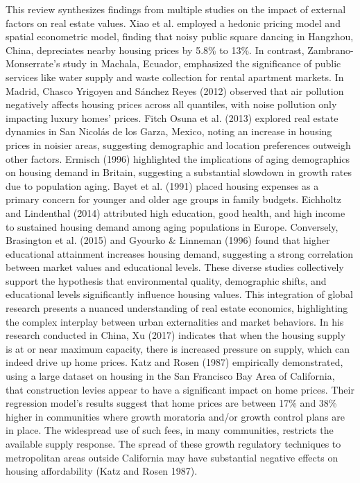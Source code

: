 \documentclass{aip-cp}
\begin{document}
This review synthesizes findings from multiple studies on the impact of external factors on real estate values. Xiao et al.\cite{XIAO2020} employed a hedonic pricing model and spatial econometric model, finding that noisy public square dancing in Hangzhou, China, depreciates nearby housing prices by 5.8\% to 13\%. In contrast, Zambrano-Monserrate's\cite{zambrano2016formacion} study in Machala, Ecuador, emphasized the significance of public services like water supply and waste collection for rental apartment markets. In Madrid, Chasco Yrigoyen and Sánchez Reyes (2012) observed that air pollution negatively affects housing prices across all quantiles, with noise pollution only impacting luxury homes' prices. Fitch Osuna et al. (2013) explored real estate dynamics in San Nicolás de los Garza, Mexico, noting an increase in housing prices in noisier areas, suggesting demographic and location preferences outweigh other factors.
Ermisch (1996) highlighted the implications of aging demographics on housing demand in Britain, suggesting a substantial slowdown in growth rates due to population aging. Bayet et al. (1991) placed housing expenses as a primary concern for younger and older age groups in family budgets. Eichholtz and Lindenthal (2014) attributed high education, good health, and high income to sustained housing demand among aging populations in Europe. Conversely, Brasington et al. (2015) and Gyourko \& Linneman (1996) found that higher educational attainment increases housing demand, suggesting a strong correlation between market values and educational levels.
These diverse studies collectively support the hypothesis that environmental quality, demographic shifts, and educational levels significantly influence housing values. This integration of global research presents a nuanced understanding of real estate economics, highlighting the complex interplay between urban externalities and market behaviors.
In his research conducted in China, Xu (2017) indicates that when the housing supply is at or near maximum capacity, there is increased pressure on supply, which can indeed drive up home prices. Katz and Rosen (1987) empirically demonstrated, using a large dataset on housing in the San Francisco Bay Area of California, that construction levies appear to have a significant impact on home prices. Their regression model's results suggest that home prices are between 17\% and 38\% higher in communities where growth moratoria and/or growth control plans are in place. The widespread use of such fees, in many communities, restricts the available supply response. The spread of these growth regulatory techniques to metropolitan areas outside California may have substantial negative effects on housing affordability (Katz and Rosen 1987).
\end{document}
